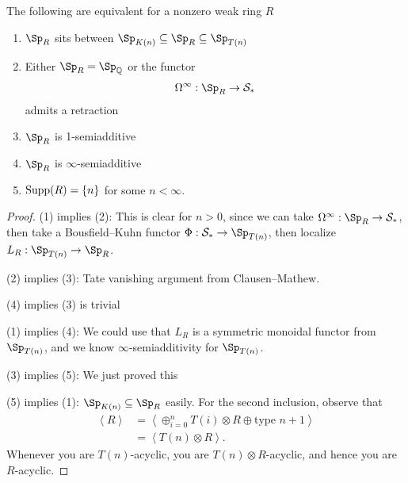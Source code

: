 \begin{theorem} The following are equivalent for a nonzero weak ring $R$
\begin{enumerate}
    \item $\Sp_R$ sits between $\Sp_{K(n)} \subseteq \Sp_R \subseteq \Sp_{T(n)}$
    \item Either $\Sp_R = \Sp_\mathbb{Q}$ or the functor
    \begin{align*}
        \Omega^\infty : \Sp_R \to \mathcal{S}_\ast
    \end{align*}
    admits a retraction
    \item $\Sp_R$ is 1-semiadditive
    \item $\Sp_R$ is $\infty$-semiadditive
    \item $\text{Supp}(R) = \left\{ n \right\}$ for some $n<\infty$.
\end{enumerate}
\end{theorem}
\begin{proof} (1) implies (2): This is clear for $n>0$, since we can take $\Omega^\infty : \Sp_R \to \mathcal{S}_\ast$, then take a Bousfield--Kuhn functor $\Phi: \mathcal{S}_\ast \to \Sp_{T(n)}$, then localize $L_R : \Sp_{T(n)} \to \Sp_R$.

(2) implies (3): Tate vanishing argument from Clausen--Mathew.

(4) implies (3) is trivial

(1) implies (4): We could use that $L_R$ is a symmetric monoidal functor from $\Sp_{T(n)}$, and we know $\infty$-semiadditivity for $\Sp_{T(n)}$.

(3) implies (5): We just proved this

(5) implies (1): $\Sp_{K(n)} \subseteq \Sp_R$ easily. For the second inclusion, observe that
\begin{align*}
    \left\langle R \right\rangle &=  \left\langle \oplus_{i=0}^n T(i) \otimes R \oplus \text{type } n+1 \right\rangle \\
    &= \left\langle T(n) \otimes R \right\rangle.
\end{align*}
Whenever you are $T(n)$-acyclic, you are $T(n) \otimes R$-acyclic, and hence you are $R$-acyclic.
\end{proof}

